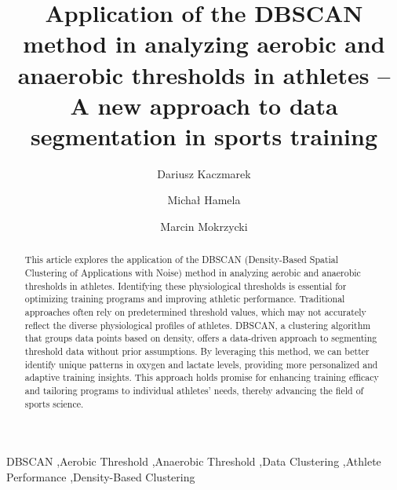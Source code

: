 \documentclass[a4paper,fleqn]{cas-dc}
\begin{document}
\let\WriteBookmarks\relax
\def\floatpagepagefraction{1}
\def\textpagefraction{.001}



\title [mode = title]{Application of the DBSCAN method in analyzing aerobic and anaerobic thresholds in athletes – A new approach to data segmentation in sports training}                      

\author{Dariusz Kaczmarek}

\author{Michał Hamela}

\author{Marcin Mokrzycki}



\begin{abstract}
This article explores the application of the DBSCAN (Density-Based Spatial Clustering of Applications with Noise) method in analyzing aerobic and anaerobic thresholds in athletes. Identifying these physiological thresholds is essential for optimizing training programs and improving athletic performance. Traditional approaches often rely on predetermined threshold values, which may not accurately reflect the diverse physiological profiles of athletes. DBSCAN, a clustering algorithm that groups data points based on density, offers a data-driven approach to segmenting threshold data without prior assumptions. By leveraging this method, we can better identify unique patterns in oxygen and lactate levels, providing more personalized and adaptive training insights. This approach holds promise for enhancing training efficacy and tailoring programs to individual athletes' needs, thereby advancing the field of sports science.
\end{abstract}


\begin{keywords}
DBSCAN \sep Aerobic Threshold \sep Anaerobic Threshold \sep Data Clustering \sep Athlete Performance \sep Density-Based Clustering
\end{keywords}
\end{document}
